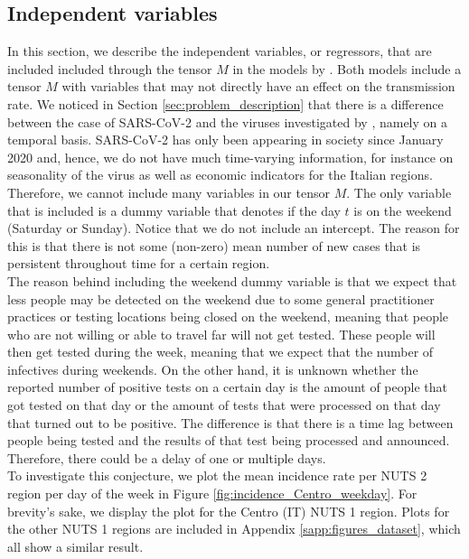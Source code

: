 \documentclass[12pt]{article}
\begin{document}
	\subsection{Independent variables} \label{subsec:regressor_data}
	In this section, we describe the independent variables, or regressors, that are included included through the tensor $M$ in the models by \textcite{adda2016economic}. Both models include a tensor $M$ with variables that may not directly have an effect on the transmission rate. We noticed in Section \ref{sec:problem_description} that there is a difference between the case of SARS-CoV-2 and the viruses investigated by \textcite{adda2016economic}, namely on a temporal basis. SARS-CoV-2 has only been appearing in society since January 2020 and, hence, we do not have much time-varying information, for instance on seasonality of the virus as well as economic indicators for the Italian regions. Therefore, we cannot include many variables in our tensor $M$. The only variable that is included is a dummy variable that denotes if the day $t$ is on the weekend (Saturday or Sunday). Notice that we do not include an intercept. The reason for this is that there is not some (non-zero) mean number of new cases that is persistent throughout time for a certain region. \\
	
	The reason behind including the weekend dummy variable is that we expect that less people may be detected on the weekend due to some general practitioner practices or testing locations being closed on the weekend, meaning that people who are not willing or able to travel far will not get tested. These people will then get tested during the week, meaning that we expect that the number of infectives during weekends. On the other hand, it is unknown whether the reported number of positive tests on a certain day is the amount of people that got tested on that day or the amount of tests that were processed on that day that turned out to be positive. The difference is that there is a time lag between people being tested and the results of that test being processed and announced. Therefore, there could be a delay of one or multiple days. \\
	
	To investigate this conjecture, we plot the mean incidence rate per NUTS 2 region per day of the week in Figure \ref{fig:incidence_Centro_weekday}. For brevity's sake, we display the plot for the Centro (IT) NUTS 1 region. Plots for the other NUTS 1 regions are included in Appendix \ref{sapp:figures_dataset}, which all show a similar result. \\
	
\end{document}
